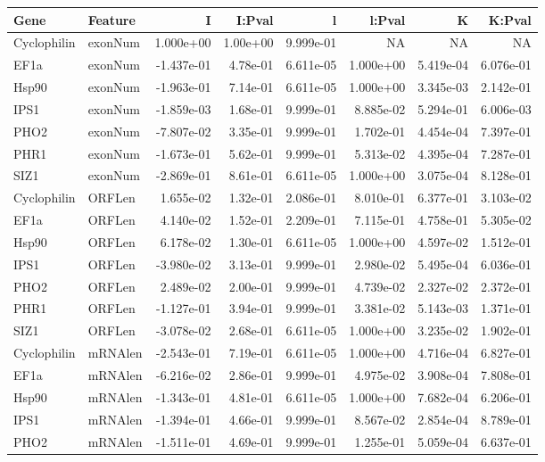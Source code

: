 \documentclass{article}
\begin{document}
\begin{tabular}{llrrrrrr}
\toprule
Gene & Feature & I & I:Pval & l & l:Pval & K & K:Pval \\ 
\midrule
Cyclophilin & exonNum &  1.000e+00 & 1.00e+00 & 9.999e-01 &        NA &        NA &        NA \\ 
EF1a & exonNum & -1.437e-01 & 4.78e-01 & 6.611e-05 & 1.000e+00 & 5.419e-04 & 6.076e-01 \\ 
Hsp90 & exonNum & -1.963e-01 & 7.14e-01 & 6.611e-05 & 1.000e+00 & 3.345e-03 & 2.142e-01 \\ 
IPS1 & exonNum & -1.859e-03 & 1.68e-01 & 9.999e-01 & 8.885e-02 & 5.294e-01 & 6.006e-03 \\ 
PHO2 & exonNum & -7.807e-02 & 3.35e-01 & 9.999e-01 & 1.702e-01 & 4.454e-04 & 7.397e-01 \\ 
PHR1 & exonNum & -1.673e-01 & 5.62e-01 & 9.999e-01 & 5.313e-02 & 4.395e-04 & 7.287e-01 \\ 
SIZ1 & exonNum & -2.869e-01 & 8.61e-01 & 6.611e-05 & 1.000e+00 & 3.075e-04 & 8.128e-01 \\ 
Cyclophilin & ORFLen &  1.655e-02 & 1.32e-01 & 2.086e-01 & 8.010e-01 & 6.377e-01 & 3.103e-02 \\ 
EF1a & ORFLen &  4.140e-02 & 1.52e-01 & 2.209e-01 & 7.115e-01 & 4.758e-01 & 5.305e-02 \\ 
Hsp90 & ORFLen &  6.178e-02 & 1.30e-01 & 6.611e-05 & 1.000e+00 & 4.597e-02 & 1.512e-01 \\ 
IPS1 & ORFLen & -3.980e-02 & 3.13e-01 & 9.999e-01 & 2.980e-02 & 5.495e-04 & 6.036e-01 \\ 
PHO2 & ORFLen &  2.489e-02 & 2.00e-01 & 9.999e-01 & 4.739e-02 & 2.327e-02 & 2.372e-01 \\ 
PHR1 & ORFLen & -1.127e-01 & 3.94e-01 & 9.999e-01 & 3.381e-02 & 5.143e-03 & 1.371e-01 \\ 
SIZ1 & ORFLen & -3.078e-02 & 2.68e-01 & 6.611e-05 & 1.000e+00 & 3.235e-02 & 1.902e-01 \\ 
Cyclophilin & mRNAlen & -2.543e-01 & 7.19e-01 & 6.611e-05 & 1.000e+00 & 4.716e-04 & 6.827e-01 \\ 
EF1a & mRNAlen & -6.216e-02 & 2.86e-01 & 9.999e-01 & 4.975e-02 & 3.908e-04 & 7.808e-01 \\ 
Hsp90 & mRNAlen & -1.343e-01 & 4.81e-01 & 6.611e-05 & 1.000e+00 & 7.682e-04 & 6.206e-01 \\ 
IPS1 & mRNAlen & -1.394e-01 & 4.66e-01 & 9.999e-01 & 8.567e-02 & 2.854e-04 & 8.789e-01 \\ 
PHO2 & mRNAlen & -1.511e-01 & 4.69e-01 & 9.999e-01 & 1.255e-01 & 5.059e-04 & 6.637e-01 \\ 

\end{tabular}
\end{document}
